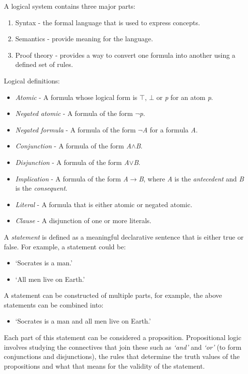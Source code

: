 \documentclass{report}
\begin{document}
A logical system contains three major parts:

\begin{enumerate}
\item Syntax - the formal language that is used to express concepts.
\item Semantics - provide meaning for the language.
\item Proof theory - provides a way to convert one formula into another using a defined set of rules.
\end{enumerate}

Logical definitions:

\begin{itemize}
\item \emph{Atomic} - A formula whose logical form is $\top$, $\bot$ or \textit{p} for an atom \textit{p}.
\item \emph{Negated atomic} - A formula of the form $\neg$\textit{p}.
\item \emph{Negated formula} - A formula of the form $\neg$\textit{A} for a formula \textit{A}.
\item \emph{Conjunction} - A formula of the form \textit{A}$\land$\textit{B}.
\item \emph{Disjunction} - A formula of the form \textit{A}$\lor$\textit{B}.
\item \emph{Implication} - A formula of the form \textit{A}$\to$\textit{B}, where \textit{A} is the \emph{antecedent} and \textit{B} is the \emph{consequent}.
\item \emph{Literal} - A formula that is either atomic or negated atomic.
\item \emph{Clause} - A disjunction of one or more literals.
\end{itemize}

A \textit{statement} is defined as a meaningful declarative sentence that is either true or false. For example, a statement could be: 

\begin{itemize}
\item `Socrates is a man.'
\item `All men live on Earth.'
\end{itemize}
A statement can be constructed of multiple parts, for example, the above statements can be combined into:

\begin{itemize}
\item `Socrates is a man and all men live on Earth.'
\end{itemize}
Each part of this statement can be considered a proposition. Propositional logic involves studying the connectives that join these such as \textit{`and'} and \textit{`or'} (to form conjunctions and disjunctions), the rules that determine the truth values of the propositions and what that means for the validity of the statement.
\end{document}

